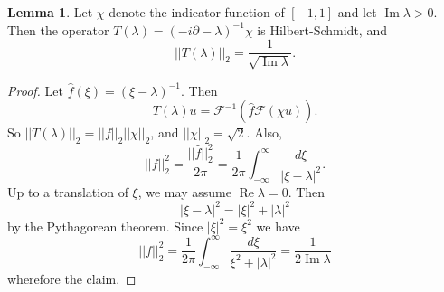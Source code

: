 \documentclass[12pt]{report}
\renewcommand{\Re}{\operatorname{Re}}
\renewcommand{\Im}{\operatorname{Im}}
\theoremstyle{definition}
\newtheorem{lemma}[theorem]{Lemma}
\begin{document}
\begin{lemma}
  \label{partial resolvent is hilbert schmidt}
Let $\chi$ denote the indicator function of $[-1, 1]$ and let $\Im \lambda > 0$. Then the operator $T(\lambda) = (-i\partial - \lambda)^{-1}\chi$ is Hilbert-Schmidt, and
$$||T(\lambda)||_2 = \frac{1}{\sqrt{\Im \lambda}}.$$
\end{lemma}
\begin{proof}
Let $\hat f(\xi) = (\xi - \lambda)^{-1}$. Then
$$T(\lambda)u = \mathcal F^{-1}(\hat f \mathcal F(\chi u)).$$
So $||T(\lambda)||_2 = ||f||_2||\chi||_2$, and $||\chi||_2 = \sqrt 2$. Also,
$$||f||_2^2 = \frac{||\hat f||_2^2}{2\pi} = \frac{1}{2\pi} \int_{-\infty}^\infty \frac{d\xi}{|\xi - \lambda|^2}.$$
Up to a translation of $\xi$, we may assume $\Re \lambda = 0$. Then
$$|\xi - \lambda|^2 = |\xi|^2 + |\lambda|^2$$
by the Pythagorean theorem. Since $|\xi|^2 = \xi^2$ we have
$$||f||_2^2 = \frac{1}{2\pi} \int_{-\infty}^\infty \frac{d\xi}{\xi^2 + |\lambda|^2} = \frac{1}{2\Im \lambda}$$
wherefore the claim.
\end{proof}
\end{document}
